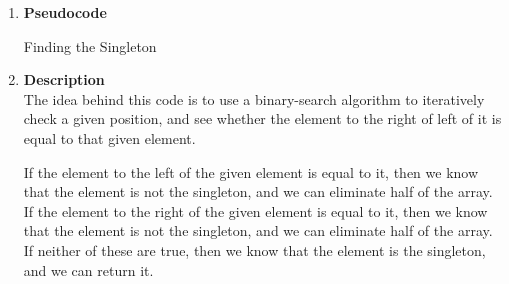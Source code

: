 \documentclass{report}
\begin{document}
    \begin{enumerate}
      \item \textbf{Pseudocode}

    \begin{algorithm}
      
      \DontPrintSemicolon
      \caption{Finding the Singleton}


    \end{algorithm}

    \item \textbf{Description} \\

    The idea behind this code is to use a binary-search algorithm to iteratively check a given position, and see whether the element to the right of left of it is equal to that given element. 

    If the element to the left of the given element is equal to it, then we know that the element is not the singleton, and we can eliminate half of the array. If the element to the right of the given element is equal to it, then we know that the element is not the singleton, and we can eliminate half of the array. If neither of these are true, then we know that the element is the singleton, and we can return it.


\end{enumerate}
\end{document}
